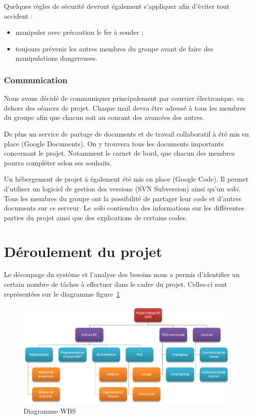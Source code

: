 \documentclass[a4paper,12pt]{report}
\begin{document}
		\bigskip
		Quelques règles de sécurité devront également s'appliquer afin d'éviter tout accident :
		
		\begin{itemize}
			\item manipuler avec précaution le fer à souder ;
			\item toujours prévenir les autres membres du groupe avant de faire des manipulations dangereuses.
		\end{itemize}
		

		\subsubsection{Communication}
		Nous avons décidé de communiquer principalement par courrier électronique, en dehors des séances de projet. Chaque mail devra être adressé à tous les membres du groupe afin que chacun soit au courant des avancées des autres.
		
		De plus un service de partage de documents et de travail collaboratif à été mis en place (Google Documents). On y trouvera tous les documents importants concernant le projet. Notamment le carnet de bord, que chacun des membres pourra compléter selon ses souhaits.
	
		Un hébergement de projet à également été mis en place (Google Code). Il permet d’utiliser un logiciel de gestion des versions (SVN Subversion) ainsi qu'un \emph{wiki}. Tous les membres du groupe ont la possibilité de partager leur code et d'autres documents sur ce serveur. Le \emph{wiki} contiendra des informations sur les différentes parties du projet ainsi que des explications de certains codes.


	\section{Déroulement du projet}
	
	Le découpage du système et l'analyse des besoins nous a permis d'identifier un certain nombre de tâches à effectuer dans le cadre du projet. Celles-ci sont représentées sur le diagramme figure~\ref{wbs}
	
	\begin{figure}%
	\begin{center}
		\includegraphics[scale=1.1]{images/wbs.png}
	\end{center}
	\caption{Diagramme WBS} 
	\label{wbs}
	\end{figure}
	
\end{document}
